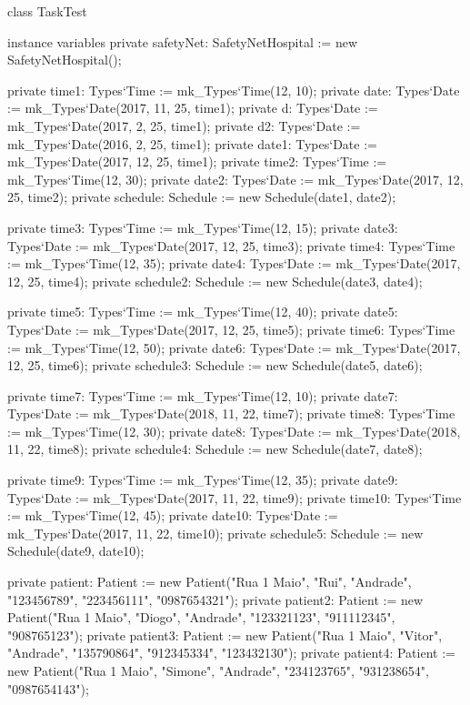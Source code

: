 \begin{vdmpp}[breaklines=true]
class TaskTest

instance variables
 private safetyNet: SafetyNetHospital := new SafetyNetHospital();
 
 private time1: Types`Time := mk_Types`Time(12, 10);
 private date: Types`Date := mk_Types`Date(2017, 11, 25, time1);
 private d: Types`Date := mk_Types`Date(2017, 2, 25, time1);
 private d2: Types`Date := mk_Types`Date(2016, 2, 25, time1);
 private date1: Types`Date := mk_Types`Date(2017, 12, 25, time1);
 private time2: Types`Time := mk_Types`Time(12, 30);
 private date2: Types`Date := mk_Types`Date(2017, 12, 25, time2);
 private schedule: Schedule := new Schedule(date1, date2);
 
 private time3: Types`Time := mk_Types`Time(12, 15);
 private date3: Types`Date := mk_Types`Date(2017, 12, 25, time3);
 private time4: Types`Time := mk_Types`Time(12, 35);
 private date4: Types`Date := mk_Types`Date(2017, 12, 25, time4);
 private schedule2: Schedule := new Schedule(date3, date4);
 
 private time5: Types`Time := mk_Types`Time(12, 40);
 private date5: Types`Date := mk_Types`Date(2017, 12, 25, time5);
 private time6: Types`Time := mk_Types`Time(12, 50);
 private date6: Types`Date := mk_Types`Date(2017, 12, 25, time6);
 private schedule3: Schedule := new Schedule(date5, date6);
 
 private time7: Types`Time := mk_Types`Time(12, 10);
 private date7: Types`Date := mk_Types`Date(2018, 11, 22, time7);
 private time8: Types`Time := mk_Types`Time(12, 30);
 private date8: Types`Date := mk_Types`Date(2018, 11, 22, time8);
 private schedule4: Schedule := new Schedule(date7, date8);
 
 private time9: Types`Time := mk_Types`Time(12, 35);
 private date9: Types`Date := mk_Types`Date(2017, 11, 22, time9);
 private time10: Types`Time := mk_Types`Time(12, 45);
 private date10: Types`Date := mk_Types`Date(2017, 11, 22, time10);
 private schedule5: Schedule := new Schedule(date9, date10);
 
 private patient: Patient := new Patient("Rua 1 Maio", "Rui", "Andrade", "123456789", "223456111", "0987654321");
 private patient2: Patient := new Patient("Rua 1 Maio", "Diogo", "Andrade", "123321123", "911112345", "908765123");
 private patient3: Patient := new Patient("Rua 1 Maio", "Vitor", "Andrade", "135790864", "912345334", "123432130");
 private patient4: Patient := new Patient("Rua 1 Maio", "Simone", "Andrade", "234123765", "931238654", "0987654143"); 
  

\end{vdmpp}

